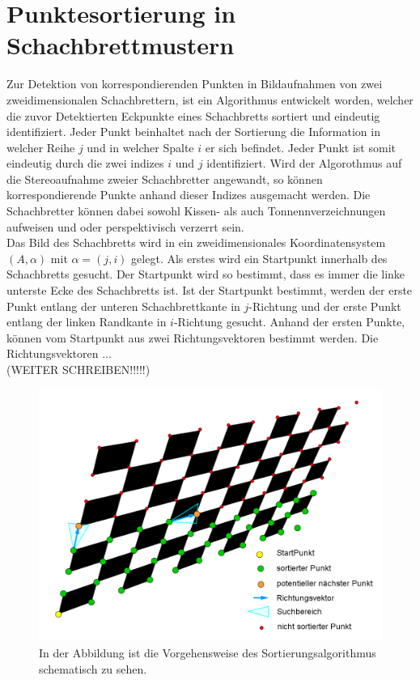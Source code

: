 \chapter{Punktesortierung in Schachbrettmustern}
\label{sec:schachbrettAlg} 


Zur Detektion von korrespondierenden Punkten in Bildaufnahmen von zwei zweidimensionalen Schachbrettern, ist ein Algorithmus entwickelt worden, welcher die zuvor Detektierten Eckpunkte eines Schachbretts sortiert und eindeutig identifiziert. Jeder Punkt beinhaltet nach der Sortierung die Information in welcher Reihe $j$ und in welcher Spalte $i$ er sich befindet. Jeder Punkt ist somit eindeutig durch die zwei indizes $i$ und $j$ identifiziert. Wird der Algorothmus auf die Stereoaufnahme zweier Schachbretter angewandt, so können korrespondierende Punkte anhand dieser Indizes ausgemacht werden. Die Schachbretter können dabei sowohl Kissen- als auch Tonnennverzeichnungen aufweisen und oder perspektivisch verzerrt sein.\\ 



Das Bild des Schachbretts wird in ein zweidimensionales Koordinatensystem $(A,\alpha)$ mit $\alpha = (j,i)$ gelegt. Als erstes wird ein Startpunkt innerhalb des Schachbretts gesucht. Der Startpunkt wird so bestimmt, dass es immer die linke unterste Ecke des Schachbretts ist. Ist der Startpunkt bestimmt, werden der erste Punkt entlang der unteren Schachbrettkante in $j$-Richtung und der erste Punkt entlang der linken Randkante in $i$-Richtung gesucht. Anhand der ersten Punkte, können vom Startpunkt aus zwei Richtungsvektoren bestimmt werden. Die Richtungsvektoren ...\\



(WEITER SCHREIBEN!!!!!)\\


\begin{figure}[!htb]
	\centering
	\includegraphics[width=0.8\linewidth]{images/VerzeichnetesSchachbretFunktion.png}
	\caption[Funktionsübersicht des Sorieralgorithmus]{In der Abbildung ist die Vorgehensweise des Sortierungsalgorithmus schematisch zu sehen.}
	\label{fig:UebersichtSortierungsAlg}
\end{figure}




